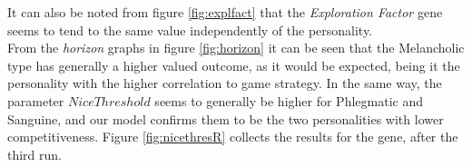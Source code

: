 It can also be noted from figure \ref{fig:explfact} that the \emph{Exploration Factor} gene seems to tend to the same value independently of the personality.\\
From the \emph{horizon} graphs in figure \ref{fig:horizon} it can be seen that the Melancholic type has generally a higher valued outcome, as it would be expected, being it the personality with the higher correlation to game strategy. In the same way, the parameter $NiceThreshold$ seems to generally be higher for Phlegmatic and Sanguine, and our model confirms them to be the two personalities with lower competitiveness. Figure \ref{fig:nicethresR} collects the results for the gene, after the third run.
\begin{figure}[ht!]
\centering
    \quad

\end{figure}
